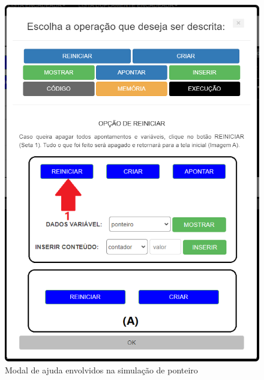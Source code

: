 \begin{figure}[htb]
    \begin{center}
	    \includegraphics[scale=0.25]{figs/debugandoED-modais-help-01.png}
	\end{center}
    \caption{\label{debugandoED-modais-help-01}Modal de ajuda envolvidos na simulação de ponteiro}
\end{figure}

